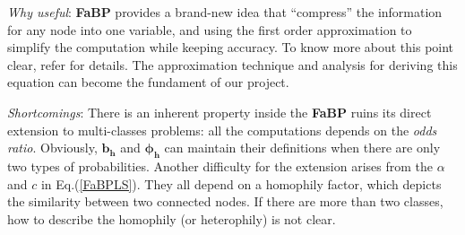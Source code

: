 \begin{itemize*}
\item {\em Why useful}:
\textbf{FaBP} provides a brand-new idea that ``compress'' the information for any node into one variable, and using the first order approximation to simplify the computation while keeping accuracy. To know more about this point clear, refer \cite{KoutraKKCPF11} for details. The approximation technique and analysis for deriving this equation can become the fundament of our project.

\item {\em Shortcomings}:
There is an inherent property inside the \textbf{FaBP} ruins its direct extension to multi-classes problems: all the computations depends on the \emph{odds ratio}. Obviously, $\mathbf{b_h}$ and $\mathbf{\phi_h}$ can maintain their definitions when there are only two types of probabilities. Another difficulty for the extension arises from the $\alpha$ and $c$ in Eq.(\ref{FaBPLS}). They all depend on a homophily factor, which depicts the similarity between two connected nodes. If there are more than two classes, how to describe the homophily (or heterophily) is not clear.
\end{itemize*}



